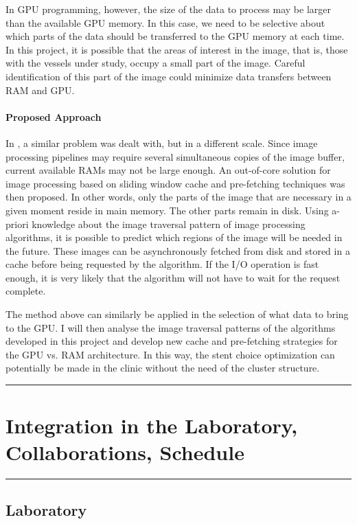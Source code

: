 \documentclass[a4paper]{article}
\newcommand{\approach}{\paragraph{Proposed Approach}}
\newcommand{\citep}{\cite}
\begin{document}
In GPU programming, however, the size of the data to process may be larger than the available GPU memory. In this case, we need to be selective about which parts of the data should be transferred to the GPU memory at each time. In this project, it is possible that the areas of interest in the image, that is, those with the vessels under study, occupy a small part of the image. Careful identification of this part of the image could minimize data transfers between RAM and GPU. 

\approach
In \citep{Pinho:Cache1}, a similar problem was dealt with, but in a different scale. Since image processing pipelines may require several simultaneous copies of the image buffer, current available RAMs may not be large enough. An out-of-core solution for image processing based on sliding window cache and pre-fetching techniques was then proposed. In other words, only the parts of the image that are necessary in a given moment reside in main memory. The other parts remain in disk. Using a-priori knowledge about the image traversal pattern of image processing algorithms, it is possible to predict which regions of the image will be needed in the future. These images can be asynchronously fetched from disk and stored in a cache before being requested by the algorithm. If the I/O operation is fast enough, it is very likely that the algorithm will not have to wait for the request complete. 

The method above can similarly be applied in the selection of what data to bring to the GPU. I will then analyse the image traversal patterns of the algorithms developed in this project and develop new cache and pre-fetching strategies for the GPU vs. RAM architecture. In this way, the stent choice optimization can potentially be made in the clinic without the need of the cluster structure.

\medskip
\medskip
\hrule
\section{Integration in the Laboratory, Collaborations, Schedule}
\hrule

\medskip
\medskip

\subsection{Laboratory}
\end{document}
